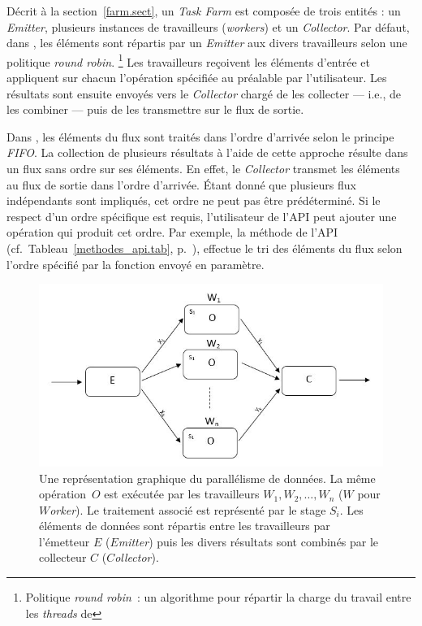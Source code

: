 D\'ecrit \`a la section~\ref{farm.sect}, un \emph{Task Farm} est compos\'ee de trois entit\'es : un \emph{Emitter}, plusieurs instances de travailleurs (\emph{workers}) et un \emph{Collector}. Par d\'efaut, dans \PpFf{}, les \'el\'ements sont r\'epartis par un \emph{Emitter} aux divers travailleurs selon une politique \emph{round robin}.%
%
\footnote{Politique \emph{round robin}~: un algorithme pour r\'epartir la charge du travail entre les \emph{threads} de  
} 
%
Les travailleurs re\c{c}oivent les \'el\'ements d'entr\'ee et appliquent sur chacun l'op\'eration sp\'ecifi\'ee au pr\'ealable par l'utilisateur. Les r\'esultats sont ensuite envoy\'es vers le \emph{Collector} charg\'e de les collecter --- i.e., de les combiner --- puis de les transmettre sur le flux de sortie.

Dans , les \'el\'ements du flux sont trait\'es dans l'ordre d'arriv\'ee selon le principe \emph{FIFO}. La collection de plusieurs r\'esultats \`a l'aide de cette approche r\'esulte dans un flux sans ordre sur ses \'el\'ements. En effet, le \emph{Collector} transmet les \'el\'ements au flux de sortie dans l'ordre d'arriv\'ee. \'Etant donn\'e que plusieurs flux ind\'ependants sont impliqu\'es, cet ordre ne peut pas \^etre pr\'ed\'etermin\'e. Si le respect d'un  ordre sp\'ecifique est requis, l'utilisateur de l'API peut ajouter une op\'eration qui produit cet ordre. Par exemple, la m\'ethode  de l'API (cf.~Tableau~\ref{methodes_api.tab}, p.~\pageref{sort.page}), effectue le tri des \'el\'ements du flux selon l'ordre sp\'ecifi\'e par la fonction  envoy\'e en param\`etre.

\begin{figure}
\centering
     \includegraphics[width=1.0\textwidth]{Figures/DataParallelisme.jpg}
      \caption[Une repr\'esentation graphique du parall\'elisme de donn\'ees en \ppff.]{Une repr\'esentation graphique du parall\'elisme de donn\'ees. La m\^eme op\'eration~$O$ est ex\'ecut\'ee par les travailleurs $W_1, W_2,\ldots, W_n$ ($W$ pour \emph{$W$orker}). Le traitement associ\'e est repr\'esent\'e par le stage $S_i$. Les \'el\'ements de donn\'ees sont r\'epartis entre les travailleurs par l'\'emetteur $E$ ($E$\emph{mitter}) puis les divers r\'esultats sont combin\'es par le collecteur $C$ ($C$\emph{ollector}).}
       \label{DataParallelisme.fig}
\end{figure}

